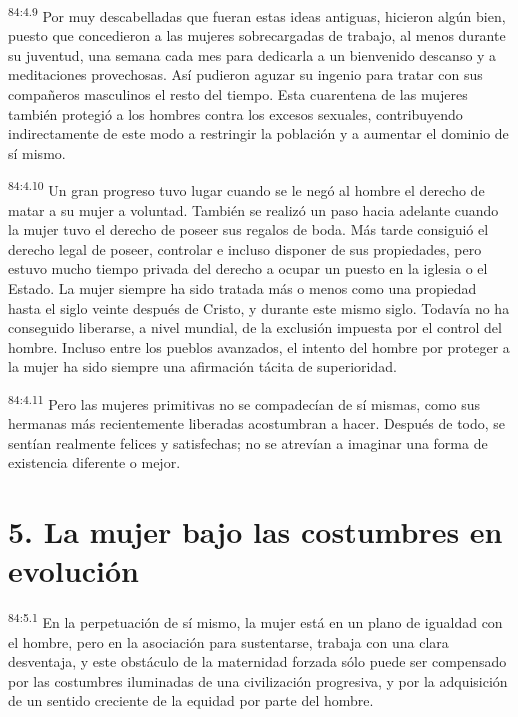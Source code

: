 \par
\textsuperscript{84:4.9} Por muy descabelladas que fueran estas ideas antiguas, hicieron algún bien, puesto que concedieron a las mujeres sobrecargadas de trabajo, al menos durante su juventud, una semana cada mes para dedicarla a un bienvenido descanso y a meditaciones provechosas. Así pudieron aguzar su ingenio para tratar con sus compañeros masculinos el resto del tiempo. Esta cuarentena de las mujeres también protegió a los hombres contra los excesos sexuales, contribuyendo indirectamente de este modo a restringir la población y a aumentar el dominio de sí mismo.

\par
\textsuperscript{84:4.10} Un gran progreso tuvo lugar cuando se le negó al hombre el derecho de matar a su mujer a voluntad. También se realizó un paso hacia adelante cuando la mujer tuvo el derecho de poseer sus regalos de boda. Más tarde consiguió el derecho legal de poseer, controlar e incluso disponer de sus propiedades, pero estuvo mucho tiempo privada del derecho a ocupar un puesto en la iglesia o el Estado. La mujer siempre ha sido tratada más o menos como una propiedad hasta el siglo veinte después de Cristo, y durante este mismo siglo. Todavía no ha conseguido liberarse, a nivel mundial, de la exclusión impuesta por el control del hombre. Incluso entre los pueblos avanzados, el intento del hombre por proteger a la mujer ha sido siempre una afirmación tácita de superioridad.

\par
\textsuperscript{84:4.11} Pero las mujeres primitivas no se compadecían de sí mismas, como sus hermanas más recientemente liberadas acostumbran a hacer. Después de todo, se sentían realmente felices y satisfechas; no se atrevían a imaginar una forma de existencia diferente o mejor.

\section*{5. La mujer bajo las costumbres en evolución}
\par
\textsuperscript{84:5.1} En la perpetuación de sí mismo, la mujer está en un plano de igualdad con el hombre, pero en la asociación para sustentarse, trabaja con una clara desventaja, y este obstáculo de la maternidad forzada sólo puede ser compensado por las costumbres iluminadas de una civilización progresiva, y por la adquisición de un sentido creciente de la equidad por parte del hombre.

